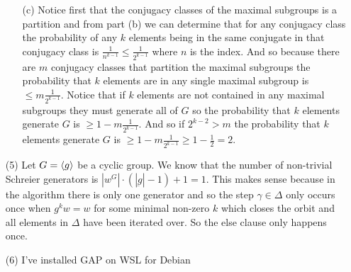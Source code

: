 \documentclass[12pt]{amsart}
\begin{document}
\begin{itemize}
\begin{itemize}
      \item[(c)]  Notice first that the conjugacy classes of the maximal subgroups is a partition 
      and from part (b) we can determine that for any conjugacy class the probability 
      of any $k$ elements being in the same conjugate in that conjugacy class is 
      $\frac{1}{n^{k-1}}\leq \frac{1}{2^{k-1}}$ where $n$ is the index. 
      And so because there are $m$ conjugacy classes that partition the maximal subgroups
      the probability that $k$ elements are in any single maximal subgroup is $\leq m\frac{1}{2^{k-1}}$.
      Notice that if $k$ elements are not contained in any maximal subgroups they must generate all of $G$
      so the probability that $k$ elements generate $G$ is $\geq 1-m\frac{1}{2^{k-1}}$. And so if $2^{k-2}>m$
      the probability that $k$ elements generate $G$ is $\geq 1-m\frac{1}{2^{k-1}}\geq 1-\frac{1}{2}=2$.


   \end{itemize}
   \item[(5)] Let $G=\left\langle g \right\rangle$ be a cyclic group. We know that the number of non-trivial 
   Schreier generators is $|w^G|\cdot (|\underbar{g}|-1)+1=1$. This makes sense because in the
   algorithm there is only one generator and so the step $\gamma\in \Delta$ only occurs 
   once when $g^kw=w$ for some minimal non-zero $k$ which closes the orbit and all elements 
   in $\Delta$ have been iterated over. So the else clause only happens once.

   \item[(6)] I've installed GAP on WSL for Debian

\end{itemize}

\end{document}

